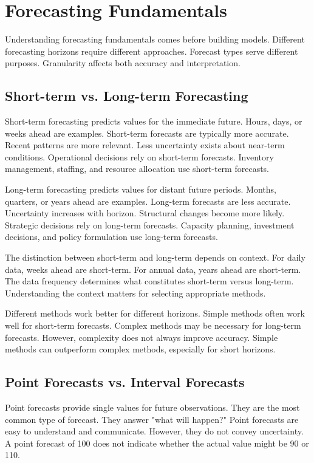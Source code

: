 \section{Forecasting Fundamentals}

Understanding forecasting fundamentals comes before building models. Different forecasting horizons require different approaches. Forecast types serve different purposes. Granularity affects both accuracy and interpretation.

\subsection{Short-term vs. Long-term Forecasting}

Short-term forecasting predicts values for the immediate future. Hours, days, or weeks ahead are examples. Short-term forecasts are typically more accurate. Recent patterns are more relevant. Less uncertainty exists about near-term conditions. Operational decisions rely on short-term forecasts. Inventory management, staffing, and resource allocation use short-term forecasts.

Long-term forecasting predicts values for distant future periods. Months, quarters, or years ahead are examples. Long-term forecasts are less accurate. Uncertainty increases with horizon. Structural changes become more likely. Strategic decisions rely on long-term forecasts. Capacity planning, investment decisions, and policy formulation use long-term forecasts.

The distinction between short-term and long-term depends on context. For daily data, weeks ahead are short-term. For annual data, years ahead are short-term. The data frequency determines what constitutes short-term versus long-term. Understanding the context matters for selecting appropriate methods.

Different methods work better for different horizons. Simple methods often work well for short-term forecasts. Complex methods may be necessary for long-term forecasts. However, complexity does not always improve accuracy. Simple methods can outperform complex methods, especially for short horizons.

\subsection{Point Forecasts vs. Interval Forecasts}

Point forecasts provide single values for future observations. They are the most common type of forecast. They answer "what will happen?" Point forecasts are easy to understand and communicate. However, they do not convey uncertainty. A point forecast of 100 does not indicate whether the actual value might be 90 or 110.

